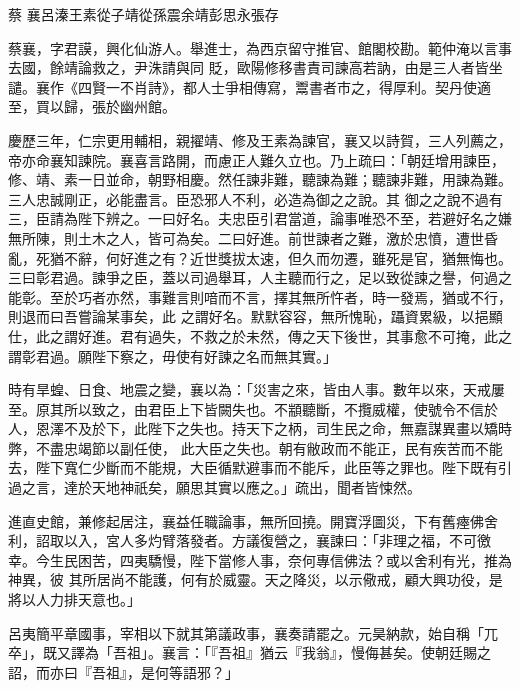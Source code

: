 
\begin{pinyinscope}

 蔡
 襄呂溱王素從子靖從孫震余靖彭思永張存



 蔡襄，字君謨，興化仙游人。舉進士，為西京留守推官、館閣校勘。範仲淹以言事去國，餘靖論救之，尹洙請與同
 貶，歐陽修移書責司諫高若訥，由是三人者皆坐譴。襄作《四賢一不肖詩》，都人士爭相傳寫，鬻書者市之，得厚利。契丹使適至，買以歸，張於幽州館。



 慶歷三年，仁宗更用輔相，親擢靖、修及王素為諫官，襄又以詩賀，三人列薦之，帝亦命襄知諫院。襄喜言路開，而慮正人難久立也。乃上疏曰：「朝廷增用諫臣，修、靖、素一日並命，朝野相慶。然任諫非難，聽諫為難；聽諫非難，用諫為難。三人忠誠剛正，必能盡言。臣恐邪人不利，必造為御之之說。其
 御之之說不過有三，臣請為陛下辨之。一曰好名。夫忠臣引君當道，論事唯恐不至，若避好名之嫌無所陳，則土木之人，皆可為矣。二曰好進。前世諫者之難，激於忠憤，遭世昏亂，死猶不辭，何好進之有？近世獎拔太速，但久而勿遷，雖死是官，猶無悔也。三曰彰君過。諫爭之臣，蓋以司過舉耳，人主聽而行之，足以致從諫之譽，何過之能彰。至於巧者亦然，事難言則喑而不言，擇其無所忤者，時一發焉，猶或不行，則退而曰吾嘗論某事矣，此
 之謂好名。默默容容，無所愧恥，躡資累級，以挹顯仕，此之謂好進。君有過失，不救之於未然，傳之天下後世，其事愈不可掩，此之謂彰君過。願陛下察之，毋使有好諫之名而無其實。」



 時有旱蝗、日食、地震之變，襄以為：「災害之來，皆由人事。數年以來，天戒屢至。原其所以致之，由君臣上下皆闕失也。不顓聽斷，不攬威權，使號令不信於人，恩澤不及於下，此陛下之失也。持天下之柄，司生民之命，無嘉謀異畫以矯時弊，不盡忠竭節以副任使，
 此大臣之失也。朝有敝政而不能正，民有疾苦而不能去，陛下寬仁少斷而不能規，大臣循默避事而不能斥，此臣等之罪也。陛下既有引過之言，達於天地神祇矣，願思其實以應之。」疏出，聞者皆悚然。



 進直史館，兼修起居注，襄益任職論事，無所回撓。開寶浮圖災，下有舊瘞佛舍利，詔取以入，宮人多灼臂落發者。方議復營之，襄諫曰：「非理之福，不可徼幸。今生民困苦，四夷驕慢，陛下當修人事，奈何專信佛法？或以舍利有光，推為神異，彼
 其所居尚不能護，何有於威靈。天之降災，以示儆戒，顧大興功役，是將以人力排天意也。」



 呂夷簡平章國事，宰相以下就其第議政事，襄奏請罷之。元昊納款，始自稱「兀卒」，既又譯為「吾祖」。襄言：「『吾祖』猶云『我翁』，慢侮甚矣。使朝廷賜之詔，而亦曰『吾祖』，是何等語邪？」




\end{pinyinscope}
